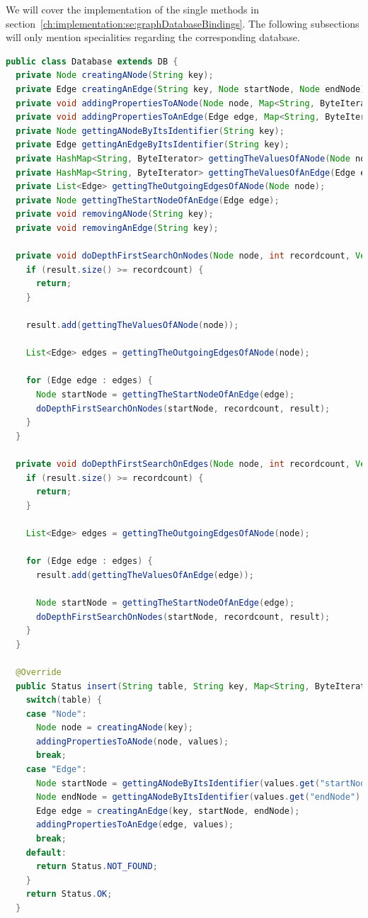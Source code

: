 We will cover the implementation of the single methods in section~\ref{ch:implementation:se:graphDatabaseBindings}.
The following subsections will only mention specialities regarding the corresponding database.

\begin{lstlisting}[language={Java},label={lst:databaseTemplate},caption={Generic example of a database implementation with the use of graph data.}]
public class Database extends DB {
  private Node creatingANode(String key);
  private Edge creatingAnEdge(String key, Node startNode, Node endNode);
  private void addingPropertiesToANode(Node node, Map<String, ByteIterator> values);
  private void addingPropertiesToAnEdge(Edge edge, Map<String, ByteIterator> values);
  private Node gettingANodeByItsIdentifier(String key);
  private Edge gettingAnEdgeByItsIdentifier(String key);
  private HashMap<String, ByteIterator> gettingTheValuesOfANode(Node node);
  private HashMap<String, ByteIterator> gettingTheValuesOfAnEdge(Edge edge);
  private List<Edge> gettingTheOutgoingEdgesOfANode(Node node);
  private Node gettingTheStartNodeOfAnEdge(Edge edge);
  private void removingANode(String key);
  private void removingAnEdge(String key);

  private void doDepthFirstSearchOnNodes(Node node, int recordcount, Vector<HashMap<String, ByteIterator>> result) {
    if (result.size() >= recordcount) {
      return;
    }

    result.add(gettingTheValuesOfANode(node));

    List<Edge> edges = gettingTheOutgoingEdgesOfANode(node);

    for (Edge edge : edges) {
      Node startNode = gettingTheStartNodeOfAnEdge(edge);
      doDepthFirstSearchOnNodes(startNode, recordcount, result);
    }
  }

  private void doDepthFirstSearchOnEdges(Node node, int recordcount, Vector<HashMap<String, ByteIterator>> result) {
    if (result.size() >= recordcount) {
      return;
    }

    List<Edge> edges = gettingTheOutgoingEdgesOfANode(node);

    for (Edge edge : edges) {
      result.add(gettingTheValuesOfAnEdge(edge));

      Node startNode = gettingTheStartNodeOfAnEdge(edge);
      doDepthFirstSearchOnNodes(startNode, recordcount, result);
    }
  }

  @Override
  public Status insert(String table, String key, Map<String, ByteIterator> values) {
    switch(table) {
    case "Node":
      Node node = creatingANode(key);
      addingPropertiesToANode(node, values);
      break;
    case "Edge":
      Node startNode = gettingANodeByItsIdentifier(values.get("startNode").toString());
      Node endNode = gettingANodeByItsIdentifier(values.get("endNode").toString());
      Edge edge = creatingAnEdge(key, startNode, endNode);
      addingPropertiesToAnEdge(edge, values);
      break;
    default:
      return Status.NOT_FOUND;
    }
    return Status.OK;
  }


\end{lstlisting}
